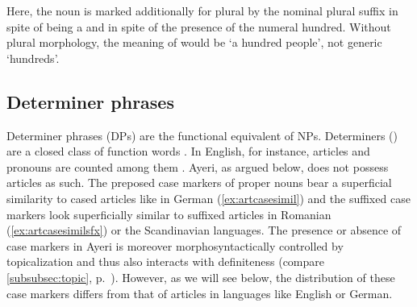 Here, the noun  is marked additionally for plural
by the nominal plural suffix  in spite of being a  and in spite of the presence of the numeral 
{hundred}. Without plural morphology, the meaning of  would be `a hundred people', not generic `hundreds'.


\subsection{Determiner phrases}
\label{subsec:dps}

Determiner phrases (DPs) are the functional equivalent of NPs. Determiners
() are a closed class of function words \citep[102]{bresnan2016}. In
English, for instance, articles and pronouns are counted among them
\citep[208--211]{carnie2013}. Ayeri, as argued below, does not possess articles
as such. The preposed case markers of proper nouns bear a superficial
similarity to cased articles like in German (\ref{ex:artcasesimil}) and the
suffixed case markers look superficially similar to suffixed articles in
Romanian (\ref{ex:artcasesimilsfx}) or the Scandinavian languages. The presence
or absence of case markers in Ayeri is moreover morphosyntactically controlled
by topicalization and thus also interacts with definiteness (compare
\autoref{subsubsec:topic}, p.~\pageref{subsubsec:topic}). However, as we will
see below, the distribution of these case markers differs from that of
articles in languages like English or German.

